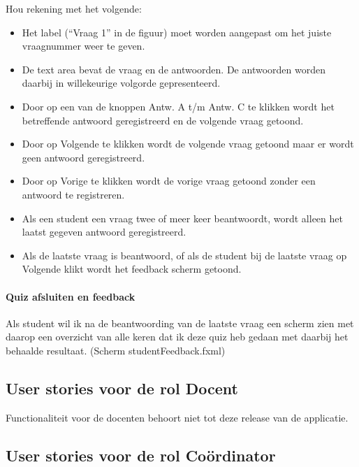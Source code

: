 \documentclass[11pt, a4paper]{article}
\begin{document}
Hou rekening met het volgende:
\begin{itemize}
\item Het label (``Vraag 1'' in de figuur) moet worden aangepast om het juiste vraagnummer weer te geven.

\item De text area bevat de vraag en de antwoorden.
De antwoorden worden daarbij in willekeurige volgorde gepresenteerd.

\item Door op een van de knoppen Antw. A t/m Antw. C te klikken wordt het betreffende antwoord geregistreerd en de volgende vraag getoond.

\item Door op Volgende te klikken wordt de volgende vraag getoond maar er wordt geen antwoord geregistreerd.

\item Door op Vorige te klikken wordt de vorige vraag getoond zonder een antwoord te registreren.

\item Als een student een vraag twee of meer keer beantwoordt, wordt alleen het laatst gegeven antwoord geregistreerd.

\item Als de laatste vraag is beantwoord, of als de student bij de laatste vraag op Volgende klikt wordt het feedback scherm getoond.

\end{itemize}

\paragraph{Quiz afsluiten en feedback}
Als student wil ik na de beantwoording van de laatste vraag een scherm zien met daarop een overzicht van alle keren dat ik deze quiz heb gedaan met daarbij het behaalde resultaat. (Scherm studentFeedback.fxml)

\subsection{User stories voor de rol Docent}

Functionaliteit voor de docenten behoort niet tot deze release van de applicatie.

\subsection{User stories voor de rol Co\"ordinator}
\end{document}

